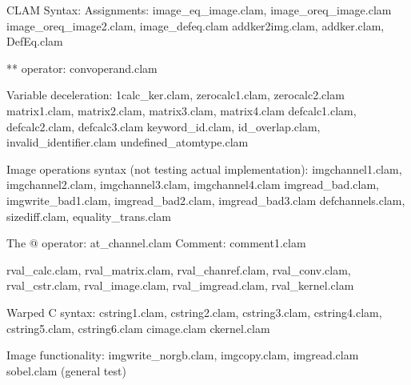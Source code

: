 CLAM Syntax:
	Assignments: 
		image_eq_image.clam, image_oreq_image.clam
		image_oreq_image2.clam, image_defeq.clam 
		addker2img.clam, addker.clam, DefEq.clam

	** operator:
		convoperand.clam

	Variable deceleration:
		1calc_ker.clam, zerocalc1.clam, zerocalc2.clam
		matrix1.clam, matrix2.clam, matrix3.clam, matrix4.clam 
		defcalc1.clam, defcalc2.clam, defcalc3.clam
		keyword_id.clam,  id_overlap.clam, invalid_identifier.clam
		undefined_atomtype.clam
		

	Image operations syntax (not testing actual implementation):
		imgchannel1.clam, imgchannel2.clam, imgchannel3.clam, imgchannel4.clam
		imgread_bad.clam, imgwrite_bad1.clam, imgread_bad2.clam, imgread_bad3.clam
		defchannels.clam, sizediff.clam, equality_trans.clam

	The @ operator: at_channel.clam
	Comment: comment1.clam

	rval_calc.clam, rval_matrix.clam, rval_chanref.clam, rval_conv.clam, 
	rval_cstr.clam, rval_image.clam, rval_imgread.clam, rval_kernel.clam


Warped C syntax:
	cstring1.clam, cstring2.clam, cstring3.clam, cstring4.clam, cstring5.clam, cstring6.clam
	cimage.clam
	ckernel.clam

Image functionality:
	imgwrite_norgb.clam,  imgcopy.clam,  imgread.clam
	sobel.clam (general test)
